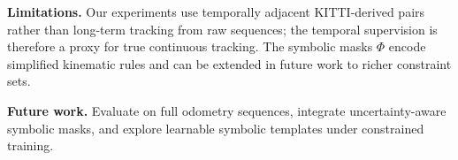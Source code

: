\noindent
\textbf{Limitations.} Our experiments use temporally adjacent KITTI-derived pairs rather than long-term tracking from raw sequences; the temporal supervision is therefore a proxy for true continuous tracking. The symbolic masks $\Phi$ encode simplified kinematic rules and can be extended in future work to richer constraint sets.

\textbf{Future work.} Evaluate on full odometry sequences, integrate uncertainty-aware symbolic masks, and explore learnable symbolic templates under constrained training.
